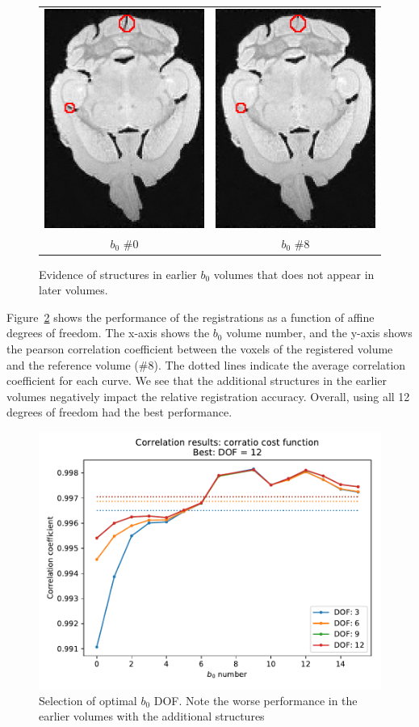 \documentclass{article}
\begin{document}
\begin{figure}[h]
  \centering
  \begin{tabular}{c c}
    \includegraphics[width=0.3\linewidth]{figs/n0_sl36.png} & \includegraphics[width=0.3\linewidth]{figs/n8_sl36}\\
    $b_0$ \#0 & $b_0$ \#8
  \end{tabular}
  \caption{Evidence of structures in earlier $b_0$ volumes that does not appear in later volumes.}
  \label{fig:b0problem}
\end{figure}

Figure~\ref{fig:b0_dof_results} shows the performance of the registrations as a
function of affine degrees of freedom. The x-axis shows the $b_0$ volume number,
and the y-axis shows the pearson correlation coefficient between the voxels of
the registered volume and the reference volume (\#8). The dotted lines indicate
the average correlation coefficient for each curve. We see that the additional
structures in the earlier volumes negatively impact the relative registration
accuracy. Overall, using all 12 degrees of freedom had the best performance.

\begin{figure}[h]
  \centering
  \includegraphics[width=0.5\linewidth]{figs/b0_corr_results}
  \captionsetup{width=0.7\linewidth}
  \caption{Selection of optimal $b_0$ DOF. Note the worse performance
    in the earlier volumes with the additional structures}
  \label{fig:b0_dof_results}
\end{figure}
\end{document}

